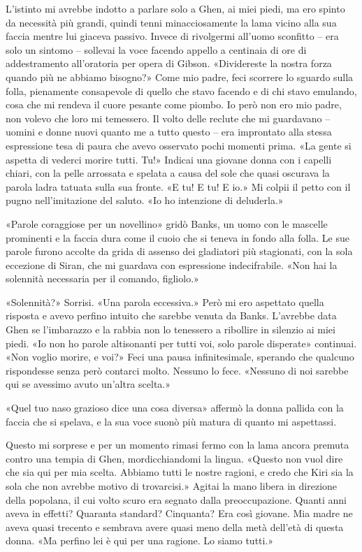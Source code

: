 L'istinto mi avrebbe indotto a parlare solo a Ghen, ai miei piedi, ma
ero spinto da necessità più grandi, quindi tenni minacciosamente la lama
vicino alla sua faccia mentre lui giaceva passivo. Invece di rivolgermi
all'uomo sconfitto -- era solo un sintomo -- sollevai la voce facendo
appello a centinaia di ore di addestramento all'oratoria per opera di
Gibson. «Dividereste la nostra forza quando più ne abbiamo bisogno?»
Come mio padre, feci scorrere lo sguardo sulla folla, pienamente
consapevole di quello che stavo facendo e di chi stavo emulando, cosa
che mi rendeva il cuore pesante come piombo. Io però non ero mio padre,
non volevo che loro mi temessero. Il volto delle reclute che mi
guardavano -- uomini e donne nuovi quanto me a tutto questo -- era
improntato alla stessa espressione tesa di paura che avevo osservato
pochi momenti prima. «La gente si aspetta di vederci morire tutti. Tu!»
Indicai una giovane donna con i capelli chiari, con la pelle arrossata e
spelata a causa del sole che quasi oscurava la parola
\foreignlanguage{italian}{ladra} \emph{} tatuata sulla sua fronte. «E
tu! E tu! E io.» Mi colpii il petto con il pugno nell'imitazione del
saluto. «Io ho intenzione di deluderla.»

«Parole coraggiose per un novellino» gridò Banks, un uomo con le
mascelle prominenti e la faccia dura come il cuoio che si teneva in
fondo alla folla. Le sue parole furono accolte da grida di assenso dei
gladiatori più stagionati, con la sola eccezione di Siran, che mi
guardava con espressione indecifrabile. «Non hai la solennità necessaria
per il comando, figliolo.»

«Solennità?» Sorrisi. «Una parola eccessiva.» Però mi ero aspettato
quella risposta e avevo perfino intuito che sarebbe venuta da Banks.
L'avrebbe data Ghen se l'imbarazzo e la rabbia non lo tenessero a
ribollire in silenzio ai miei piedi. «Io non ho parole altisonanti per
tutti voi, solo parole disperate» continuai. «Non voglio morire, e voi?»
Feci una pausa infinitesimale, sperando che qualcuno rispondesse senza
però contarci molto. Nessuno lo fece. «Nessuno di noi sarebbe qui se
avessimo avuto un'altra scelta.»

«Quel tuo naso grazioso dice una cosa diversa» affermò la donna pallida
con la faccia che si spelava, e la sua voce suonò più matura di quanto
mi aspettassi.

Questo mi sorprese e per un momento rimasi fermo con la lama ancora
premuta contro una tempia di Ghen, mordicchiandomi la lingua. «Questo
non vuol dire che sia qui per mia scelta. Abbiamo tutti le nostre
ragioni, e credo che Kiri sia la sola che non avrebbe motivo di
trovarcisi.» Agitai la mano libera in direzione della popolana, il cui
volto scuro era segnato dalla preoccupazione. Quanti anni aveva in
effetti? Quaranta standard? Cinquanta? Era così giovane. Mia madre ne
aveva quasi trecento e sembrava avere quasi meno della metà dell'età di
questa donna. «Ma perfino lei è qui per una ragione. Lo siamo tutti.»

